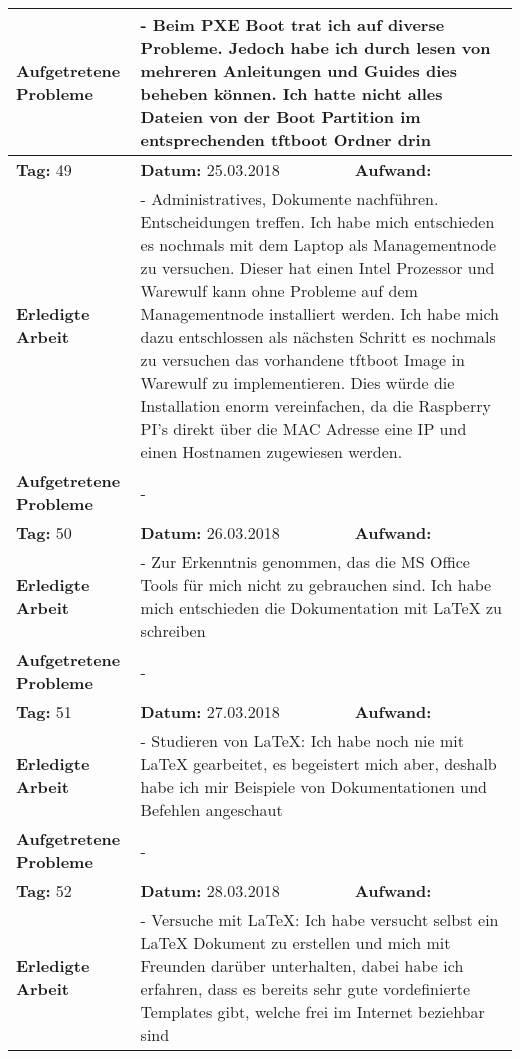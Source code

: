 \begin{longtable}{|p{5cm}|p{5cm}|p{6cm}|}
\textbf{Aufgetretene Probleme} & \multicolumn{2}{p{11cm}|}{- Beim PXE Boot trat ich auf diverse Probleme. Jedoch habe ich durch lesen von mehreren Anleitungen und Guides dies beheben können. Ich hatte nicht alles Dateien von der Boot Partition im entsprechenden tftboot Ordner drin} \\ \hline
\rowcolor{heading}\textbf{Tag:} 49 & \textbf{Datum:} 25.03.2018 & \textbf{Aufwand:} \\ \hline
\textbf{Erledigte Arbeit} & \multicolumn{2}{p{11cm}|}{- Administratives, Dokumente nachführen. Entscheidungen treffen. Ich habe mich entschieden es nochmals mit dem Laptop als Managementnode zu versuchen. Dieser hat einen Intel Prozessor und Warewulf kann ohne Probleme auf dem Managementnode installiert werden. Ich habe mich dazu entschlossen als nächsten Schritt es nochmals zu versuchen das vorhandene tftboot Image in Warewulf zu implementieren. Dies würde die Installation enorm vereinfachen, da die Raspberry PI's direkt über die MAC Adresse eine IP und einen Hostnamen zugewiesen werden.} \\ \hline
\textbf{Aufgetretene Probleme} & \multicolumn{2}{p{11cm}|}{-} \\ \hline
\rowcolor{heading}\textbf{Tag:} 50 & \textbf{Datum:} 26.03.2018 & \textbf{Aufwand:} \\ \hline
\textbf{Erledigte Arbeit} & \multicolumn{2}{p{11cm}|}{- Zur Erkenntnis genommen, das die MS Office Tools für mich nicht zu gebrauchen sind. Ich habe mich entschieden die Dokumentation mit LaTeX zu schreiben} \\ \hline
\textbf{Aufgetretene Probleme} & \multicolumn{2}{p{11cm}|}{-} \\ \hline
\rowcolor{heading}\textbf{Tag:} 51 & \textbf{Datum:} 27.03.2018 & \textbf{Aufwand:} \\ \hline
\textbf{Erledigte Arbeit} & \multicolumn{2}{p{11cm}|}{- Studieren von LaTeX: Ich habe noch nie mit LaTeX gearbeitet, es begeistert mich aber, deshalb habe ich mir Beispiele von Dokumentationen und Befehlen angeschaut} \\ \hline
\textbf{Aufgetretene Probleme} & \multicolumn{2}{p{11cm}|}{-} \\ \hline
\rowcolor{heading}\textbf{Tag:} 52 & \textbf{Datum:} 28.03.2018 & \textbf{Aufwand:} \\ \hline
\textbf{Erledigte Arbeit} & \multicolumn{2}{p{11cm}|}{- Versuche mit LaTeX: Ich habe versucht selbst ein LaTeX Dokument zu erstellen und mich mit Freunden darüber unterhalten, dabei habe ich erfahren, dass es bereits sehr gute vordefinierte Templates gibt, welche frei im Internet beziehbar sind} \\ \hline

\end{longtable}
